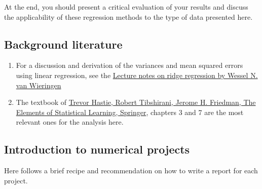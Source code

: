 \documentclass[%
oneside,                 %
final,                   %
10pt]{article}
\begin{document}
At the end, you should present a critical evaluation of your results
and discuss the applicability of these regression methods to the type
of data presented here.​

\subsection{Background literature}

\begin{enumerate}
\item For a discussion and derivation of the variances and mean squared errors using linear regression, see the \href{{https://arxiv.org/abs/1509.09169}}{Lecture notes on ridge regression by Wessel N. van Wieringen}

\item The textbook of \href{{https://www.springer.com/gp/book/9780387848570}}{Trevor Hastie, Robert Tibshirani, Jerome H. Friedman, The Elements of Statistical Learning, Springer}, chapters 3 and 7 are the most relevant ones for the analysis here. 
\end{enumerate}

\noindent
\subsection{Introduction to numerical projects}

Here follows a brief recipe and recommendation on how to write a report for each
project.
\end{document}
